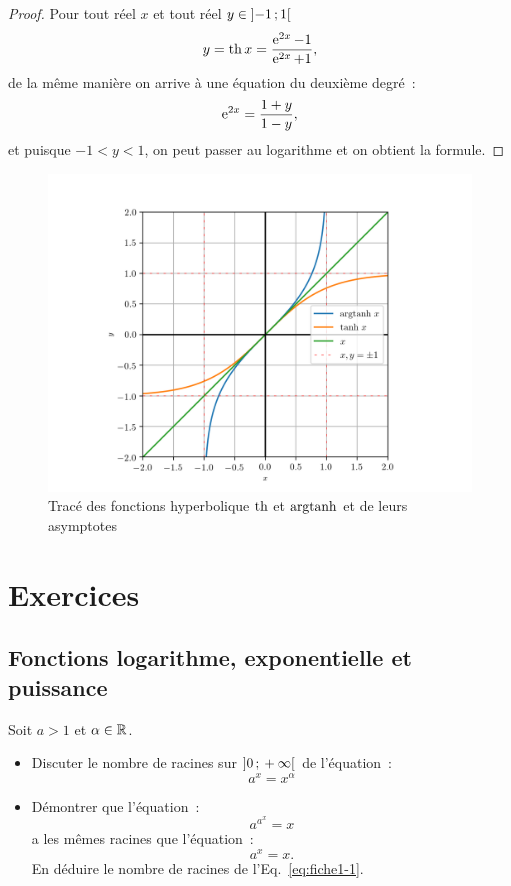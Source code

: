 \begin{proof}
  Pour tout réel \(x\) et tout réel \(y \in \left] -1 \, ; {} 1 \right[\) \[y = \operatorname{th} 
  x = \frac{\operatorname{e}^{2x}-1}{\operatorname{e}^{2x}+1},\]
  de la même manière on arrive à une équation du deuxième degré~:
  \[\operatorname{e}^{2x} = \frac{1+y}{1-y},\]
  et puisque \(-1<y<1\), on peut passer au logarithme et on obtient la formule.
\end{proof}

\begin{figure}
  \centering
  \includegraphics[scale = 0.8]{argtanh.png}
  \caption{Tracé des fonctions hyperbolique \(\operatorname{th}\) et \(\operatorname{argtanh}\) et de leurs 
  asymptotes}\label{fig:tracetanhargth}
\end{figure}

\section{Exercices}
\subsection{Fonctions logarithme, exponentielle et puissance}

\begin{exercice}
  Soit \(a > 1\) et \(\alpha \in \mathbb{R}\).
  \begin{itemize}
    \item Discuter le nombre de racines sur \(\left] 0 \, ; {} +\infty \right[\) de 
      l'équation~:
      \begin{equation}\label{eq:fiche1-1}
        a^x = x^\alpha
      \end{equation}
    \item Démontrer que l'équation~:
      \begin{equation}
        a^{a^x} = x
      \end{equation}
      a les mêmes racines que l'équation~:
      \begin{equation}
        a^x = x.
      \end{equation}
      En déduire le nombre de racines de l'Eq.~\eqref{eq:fiche1-1}.
  \end{itemize}
\end{exercice}

